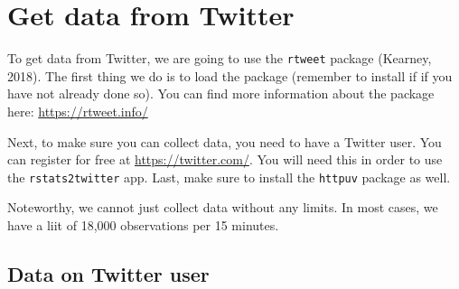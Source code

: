 \documentclass[12pt,oneside]{reedthesis}
\theoremstyle{definition}
\theoremstyle{definition}
\theoremstyle{definition}
\theoremstyle{remark}
\begin{document}
  \section{Get data from Twitter}\label{get-data-from-twitter}
  
  To get data from Twitter, we are going to use the \texttt{rtweet}
  package (Kearney, 2018). The first thing we do is to load the package
  (remember to install if if you have not already done so). You can find
  more information about the package here: \url{https://rtweet.info/}
  \begin{Shaded}
  \begin{Highlighting}[]
  \NormalTok{(}\NormalTok{)}
  \end{Highlighting}
  \end{Shaded}
  Next, to make sure you can collect data, you need to have a Twitter
  user. You can register for free at \url{https://twitter.com/}. You will
  need this in order to use the \texttt{rstats2twitter} app. Last, make
  sure to install the \texttt{httpuv} package as well.
  \begin{Shaded}
  \begin{Highlighting}[]
  \NormalTok{(}\NormalTok{)}
  \end{Highlighting}
  \end{Shaded}
  Noteworthy, we cannot just collect data without any limits. In most
  cases, we have a liit of 18,000 observations per 15 minutes.
  
  \subsection{Data on Twitter user}\label{data-on-twitter-user}
  
\end{document}
